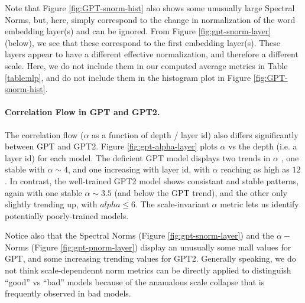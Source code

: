 Note that Figure \ref{fig:GPT-snorm-hist} also shows some unusually large Spectral Norms, but,
here, simply correspond to the change in normalization of the word embedding layer(s) and can be ignored.
From Figure \ref{fig:gpt-snorm-layer} (below), we see that these correspond to the first embedding layer(s).
These layers appear to have a different effective normalization, and therefore a different scale.
Here, we do not include them in our computed average metrics in Table \ref{table:nlp},
and do not include them in the histogram plot in Figure \ref{fig:GPT-snorm-hist}.

\paragraph{Correlation Flow in GPT and GPT2.} 
The correlation flow ($\alpha$ as a function of depth / layer id)
also differs significantly between GPT and GPT2.
Figure \ref{fig:gpt-alpha-layer} plots $\alpha$ vs the depth (i.e. a layer id) for each model.
The deficient GPT model displays two trends in $\alpha$ , one stable with $\alpha\sim 4$,
and one increasing with layer id, with $\alpha$ reaching as high as $12$.
In contrast, the well-trained GPT2 model shows consistant and stable patterns, again
with one stable $\alpha\sim 3.5$ (and below the GPT trend), and the other only
slightly trending up, with $alpha\le 6$. 
The scale-invariant $\alpha$ metric lets us identify potentially
poorly-trained models.

Notice also that the Spectral Norms
(Figure \ref{fig:gpt-snorm-layer})
and the $\alpha-$Norms
(Figure \ref{fig:gpt-pnorm-layer})
display an unusually some mall values for GPT,
and some increasing trending values for GPT2.
Generally speaking, we do not think scale-dependennt 
norm metrics can be directly applied to distinguish ``good'' vs ``bad'' models 
because of the anamalous scale collapse that is frequently observed in bad models.

